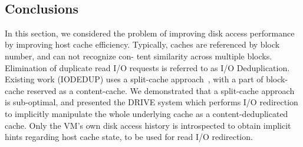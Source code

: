 \begin{figure}
\begin{floatrow}
~~~
\vspace{-0.1in}
\end{floatrow}
\end{figure}

\vspace{-0.05in}
\subsection{Conclusions}
In this section,
we considered the problem of improving disk access performance by improving host
cache efficiency. Typically, caches are referenced by block number, and can not recognize con-
tent similarity across multiple blocks. 
Elimination of duplicate read I/O requests is referred to as I/O Deduplication.
Existing work (IODEDUP) uses a split-cache approach~\cite{iodedup}, 
with a part of block-cache reserved as a content-cache. 
We demonstrated that a split-cache approach is sub-optimal, and presented
the DRIVE system which performs I/O redirection to implicitly manipulate the whole underlying
cache as a content-deduplicated cache. Only the VM's own disk access history is introspected
to obtain implicit hints regarding host cache state, to be used for read I/O redirection.

